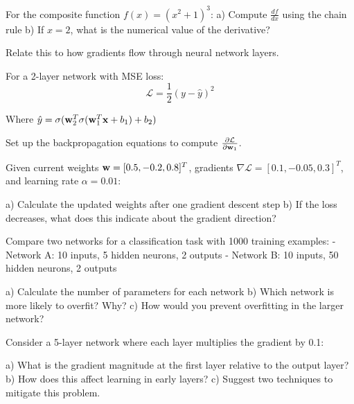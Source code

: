 \documentclass{article}
\begin{document}
\begin{problembox}[title= Chain Rule Application]

For the composite function $f(x) = (x^2 + 1)^3$:
a) Compute $\frac{df}{dx}$ using the chain rule
b) If $x = 2$, what is the numerical value of the derivative?

Relate this to how gradients flow through neural network layers.
\end{problembox}

\begin{problembox}[title= Backpropagation Setup]

For a 2-layer network with MSE loss:
$$\mathcal{L} = \frac{1}{2}(y - \hat{y})^2$$

Where $\hat{y} = \sigma(\mathbf{w}_2^T \sigma(\mathbf{w}_1^T \mathbf{x} + b_1) + b_2)$

Set up the backpropagation equations to compute $\frac{\partial \mathcal{L}}{\partial \mathbf{w}_1}$.
\end{problembox}

\begin{problembox}[title= Gradient Descent Parameter Update]

Given current weights $\mathbf{w} = [0.5, -0.2, 0.8]^T$, gradients $\nabla \mathcal{L} = [0.1, -0.05, 0.3]^T$, and learning rate $\alpha = 0.01$:

a) Calculate the updated weights after one gradient descent step
b) If the loss decreases, what does this indicate about the gradient direction?
\end{problembox}

\begin{problembox}[title= Network Capacity Analysis]

Compare two networks for a classification task with 1000 training examples:
- Network A: 10 inputs, 5 hidden neurons, 2 outputs
- Network B: 10 inputs, 50 hidden neurons, 2 outputs

a) Calculate the number of parameters for each network
b) Which network is more likely to overfit? Why?
c) How would you prevent overfitting in the larger network?
\end{problembox}

\begin{problembox}[title= Vanishing Gradient Problem]

Consider a 5-layer network where each layer multiplies the gradient by 0.1:

a) What is the gradient magnitude at the first layer relative to the output layer?
b) How does this affect learning in early layers?
c) Suggest two techniques to mitigate this problem.
\end{problembox}
\end{document}
